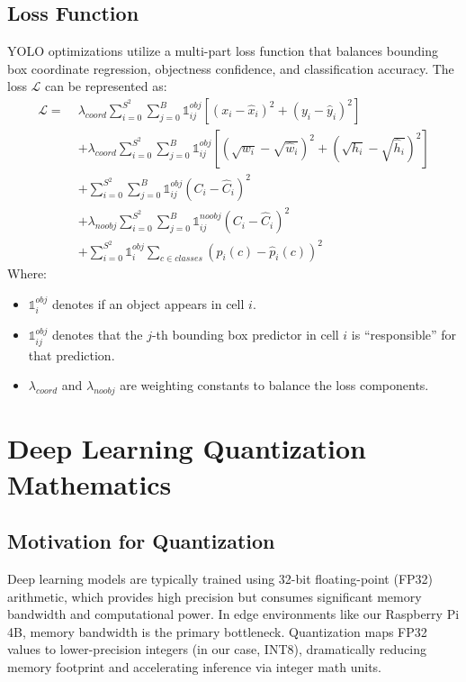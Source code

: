 \documentclass[11pt]{report}
\begin{document}
\subsection{Loss Function}
YOLO optimizations utilize a multi-part loss function that balances bounding box coordinate regression, objectness confidence, and classification accuracy. The loss $\mathcal{L}$ can be represented as:
\begin{equation}
\begin{aligned}
    \mathcal{L} = \;&\lambda_{coord} \sum_{i=0}^{S^2} \sum_{j=0}^{B} \mathbb{1}_{ij}^{obj} \left[ (x_i - \hat{x}_i)^2 + (y_i - \hat{y}_i)^2 \right] \\
    &+ \lambda_{coord} \sum_{i=0}^{S^2} \sum_{j=0}^{B} \mathbb{1}_{ij}^{obj} \left[ (\sqrt{w_i} - \sqrt{\hat{w}_i})^2 + (\sqrt{h_i} - \sqrt{\hat{h}_i})^2 \right] \\
    &+ \sum_{i=0}^{S^2} \sum_{j=0}^{B} \mathbb{1}_{ij}^{obj} (C_i - \hat{C}_i)^2 \\
    &+ \lambda_{noobj} \sum_{i=0}^{S^2} \sum_{j=0}^{B} \mathbb{1}_{ij}^{noobj} (C_i - \hat{C}_i)^2 \\
    &+ \sum_{i=0}^{S^2} \mathbb{1}_{i}^{obj} \sum_{c \in classes} (p_i(c) - \hat{p}_i(c))^2
\end{aligned}
\end{equation}
Where:
\begin{itemize}
    \item $\mathbb{1}_{i}^{obj}$ denotes if an object appears in cell $i$.
    \item $\mathbb{1}_{ij}^{obj}$ denotes that the $j$-th bounding box predictor in cell $i$ is ``responsible'' for that prediction.
    \item $\lambda_{coord}$ and $\lambda_{noobj}$ are weighting constants to balance the loss components.
\end{itemize}

\section{Deep Learning Quantization Mathematics}
\subsection{Motivation for Quantization}
Deep learning models are typically trained using 32-bit floating-point (FP32) arithmetic, which provides high precision but consumes significant memory bandwidth and computational power. In edge environments like our Raspberry Pi 4B, memory bandwidth is the primary bottleneck. Quantization maps FP32 values to lower-precision integers (in our case, INT8), dramatically reducing memory footprint and accelerating inference via integer math units.
\end{document}
